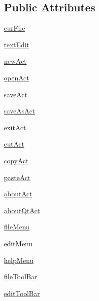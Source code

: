 \subsection*{Public Attributes}
\begin{DoxyCompactItemize}
\item 
\hyperlink{classapplication_1_1MainWindow_af1045a705272b11f6100560ff8ebd5c0}{cur\+File}
\item 
\hyperlink{classapplication_1_1MainWindow_a4ba2721ae25435eb6dc32eb851d0d501}{text\+Edit}
\item 
\hyperlink{classapplication_1_1MainWindow_a33028598a71b6147c6a11501e6a0668d}{new\+Act}
\item 
\hyperlink{classapplication_1_1MainWindow_a4c2f10f7b1180c23f0d1e0d3b210375f}{open\+Act}
\item 
\hyperlink{classapplication_1_1MainWindow_aa825ec3b5b3c280e222514b04557bad6}{save\+Act}
\item 
\hyperlink{classapplication_1_1MainWindow_a2e582129ceb46ce1529007eb26917d45}{save\+As\+Act}
\item 
\hyperlink{classapplication_1_1MainWindow_a604821afd7718f5f8c12b1930283df5f}{exit\+Act}
\item 
\hyperlink{classapplication_1_1MainWindow_a43f51803794002292fbbaa5be4a9feb2}{cut\+Act}
\item 
\hyperlink{classapplication_1_1MainWindow_a3b2da783b426850949cd893bb5cdc0f1}{copy\+Act}
\item 
\hyperlink{classapplication_1_1MainWindow_a9f491620232dbc81e1e5e2e43463bc7d}{paste\+Act}
\item 
\hyperlink{classapplication_1_1MainWindow_a1e53aedc26ea3ee343b516da4a60cc57}{about\+Act}
\item 
\hyperlink{classapplication_1_1MainWindow_a1af934555fdc13eb00b78e228234e847}{about\+Qt\+Act}
\item 
\hyperlink{classapplication_1_1MainWindow_a81261ca513849f238e0299dc637de501}{file\+Menu}
\item 
\hyperlink{classapplication_1_1MainWindow_af20a31dc760f6dc11f3bdcedbde09c82}{edit\+Menu}
\item 
\hyperlink{classapplication_1_1MainWindow_aad8492256062d90c232f5538853ecc5a}{help\+Menu}
\item 
\hyperlink{classapplication_1_1MainWindow_a8b741318b5b1a2f0869c9f295530051c}{file\+Tool\+Bar}
\item 
\hyperlink{classapplication_1_1MainWindow_a50248dae8c2aebaf9f17fcebbf4c504d}{edit\+Tool\+Bar}
\end{DoxyCompactItemize}


